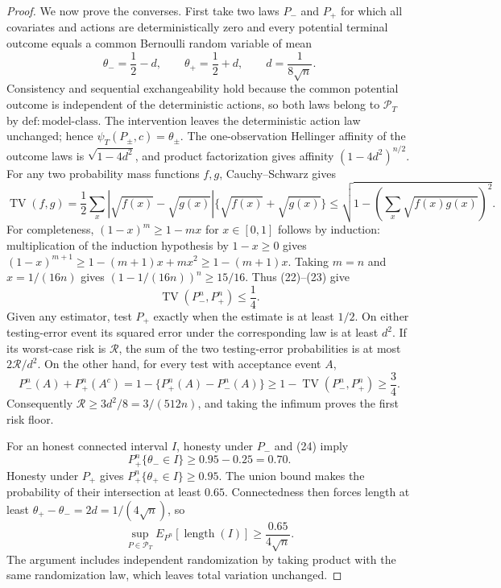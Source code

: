 \documentclass{article}
\begin{document}
\begin{proof}
We now prove the converses.  First take two laws \(P_-\) and \(P_+\) for which all covariates and actions are deterministically zero and every potential terminal outcome equals a common Bernoulli random variable of mean
\[
\theta_-=\frac12-d,
\qquad \theta_+=\frac12+d,
\qquad d=\frac1{8\sqrt n}.
\tag{22}
\]
Consistency and sequential exchangeability hold because the common potential outcome is independent of the deterministic actions, so both laws belong to \(\mathcal P_T\) by \(\mathrm{def:model\text{-}class}\).  The intervention leaves the deterministic action law unchanged; hence \(\psi_T(P_\pm,c)=\theta_\pm\).  The one-observation Hellinger affinity of the outcome laws is \(\sqrt{1-4d^2}\), and product factorization gives affinity \((1-4d^2)^{n/2}\).  For any two probability mass functions \(f,g\), Cauchy--Schwarz gives
\[
\operatorname{TV}(f,g)
=\frac12\sum_x|\sqrt{f(x)}-\sqrt{g(x)}|\{\sqrt{f(x)}+\sqrt{g(x)}\}
\leq\sqrt{1-\left(\sum_x\sqrt{f(x)g(x)}\right)^2}.
\tag{23}
\]
For completeness, \((1-x)^m\geq1-mx\) for \(x\in[0,1]\) follows by induction: multiplication of the induction hypothesis by \(1-x\geq0\) gives \((1-x)^{m+1}\geq1-(m+1)x+mx^2\geq1-(m+1)x\).  Taking \(m=n\) and \(x=1/(16n)\) gives \((1-1/(16n))^n\geq15/16\).  Thus (22)--(23) give
\[
\operatorname{TV}(P_-^n,P_+^n)\leq\frac14.
\tag{24}
\]
Given any estimator, test \(P_+\) exactly when the estimate is at least \(1/2\).  On either testing-error event its squared error under the corresponding law is at least \(d^2\).  If its worst-case risk is \(\mathcal R\), the sum of the two testing-error probabilities is at most \(2\mathcal R/d^2\).  On the other hand, for every test with acceptance event \(A\),
\[
P_-^n(A)+P_+^n(A^c)
=1-\{P_+^n(A)-P_-^n(A)\}
\geq1-\operatorname{TV}(P_-^n,P_+^n)\geq\frac34.
\tag{25}
\]
Consequently \(\mathcal R\geq3d^2/8=3/(512n)\), and taking the infimum proves the first risk floor.

For an honest connected interval \(I\), honesty under \(P_-\) and (24) imply
\[
P_+^n\{\theta_-\in I\}\geq0.95-0.25=0.70.
\tag{26}
\]
Honesty under \(P_+\) gives \(P_+^n\{\theta_+\in I\}\geq0.95\).  The union bound makes the probability of their intersection at least \(0.65\).  Connectedness then forces length at least \(\theta_+-\theta_-=2d=1/(4\sqrt n)\), so
\[
\sup_{P\in\mathcal P_T}E_{P^n}[\operatorname{length}(I)]\geq\frac{0.65}{4\sqrt n}.
\tag{27}
\]
The argument includes independent randomization by taking product with the same randomization law, which leaves total variation unchanged.


\end{proof}
\end{document}
